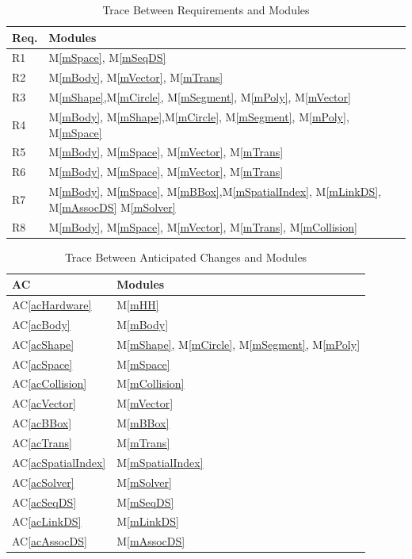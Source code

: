 \documentclass[12pt]{article}
\begin{document}
\begin{table}[h!]
\centering
\begin{tabular}{p{} p{}}
\toprule
\textbf{Req.} & \textbf{Modules}\\
\midrule
	R1 & M\ref{mSpace}, M\ref{mSeqDS} \\
	R2 & M\ref{mBody}, M\ref{mVector}, M\ref{mTrans} \\
	R3 & M\ref{mShape},M\ref{mCircle}, M\ref{mSegment}, M\ref{mPoly}, M\ref{mVector} \\
	R4 & M\ref{mBody}, M\ref{mShape},M\ref{mCircle}, M\ref{mSegment}, M\ref{mPoly}, M\ref{mSpace} \\
	R5 & M\ref{mBody}, M\ref{mSpace}, M\ref{mVector}, M\ref{mTrans} \\
	R6 & M\ref{mBody}, M\ref{mSpace}, M\ref{mVector}, M\ref{mTrans} \\
	R7 & M\ref{mBody}, M\ref{mSpace}, M\ref{mBBox},M\ref{mSpatialIndex}, M\ref{mLinkDS}, M\ref{mAssocDS} M\ref{mSolver}\\
	R8 & M\ref{mBody}, M\ref{mSpace}, M\ref{mVector}, M\ref{mTrans},
	M\ref{mCollision} \\
\bottomrule
\end{tabular}
\caption{Trace Between Requirements and Modules}
\label{TblRT}
\end{table}

\begin{table}[h!]
\centering
\begin{tabular}{p{} p{}}
\toprule
	\textbf{AC} & \textbf{Modules}\\
\midrule
	AC\ref{acHardware} & M\ref{mHH} \\
	AC\ref{acBody} & M\ref{mBody} \\
	AC\ref{acShape} & M\ref{mShape}, M\ref{mCircle}, M\ref{mSegment}, M\ref{mPoly} \\
	AC\ref{acSpace} & M\ref{mSpace} \\
	AC\ref{acCollision} & M\ref{mCollision} \\
	AC\ref{acVector} & M\ref{mVector} \\
	AC\ref{acBBox} & M\ref{mBBox} \\
	AC\ref{acTrans} & M\ref{mTrans} \\
	AC\ref{acSpatialIndex} & M\ref{mSpatialIndex} \\
	AC\ref{acSolver} & M\ref{mSolver} \\
	AC\ref{acSeqDS} & M\ref{mSeqDS} \\
	AC\ref{acLinkDS} & M\ref{mLinkDS} \\
	AC\ref{acAssocDS} & M\ref{mAssocDS} \\
\bottomrule
\end{tabular}
\caption{Trace Between Anticipated Changes and Modules}
\label{TblAT}
\end{table}
\end{document}
